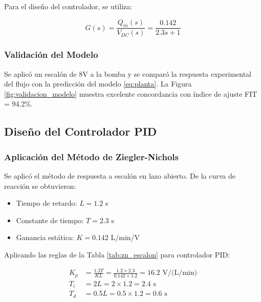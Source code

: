 \documentclass[conference]{IEEEtran}
\begin{document}
Para el diseño del controlador, se utiliza:

\begin{equation}
G(s) = \frac{Q_{in}(s)}{V_{DC}(s)} = \frac{0.142}{2.3s + 1}
\label{eq:planta}
\end{equation}

\subsubsection{Validación del Modelo}

Se aplicó un escalón de 8V a la bomba y se comparó la respuesta experimental del flujo con la predicción del modelo \eqref{eq:planta}. La Figura \ref{fig:validacion_modelo} muestra excelente concordancia con índice de ajuste FIT = 94.2\%.


\subsection{Diseño del Controlador PID}

\subsubsection{Aplicación del Método de Ziegler-Nichols}

Se aplicó el método de respuesta a escalón en lazo abierto. De la curva de reacción se obtuvieron:

\begin{itemize}
\item Tiempo de retardo: $L = 1.2$ s
\item Constante de tiempo: $T = 2.3$ s
\item Ganancia estática: $K = 0.142$ L/min/V
\end{itemize}

Aplicando las reglas de la Tabla \ref{tab:zn_escalon} para controlador PID:

\begin{align}
K_p &= \frac{1.2T}{KL} = \frac{1.2 \times 2.3}{0.142 \times 1.2} = 16.2 \text{ V/(L/min)} \\
T_i &= 2L = 2 \times 1.2 = 2.4 \text{ s} \\
T_d &= 0.5L = 0.5 \times 1.2 = 0.6 \text{ s}
\end{align}
\end{document}
